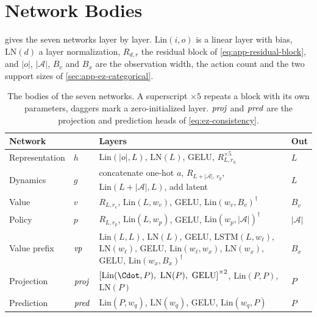\section{Network Bodies}\label{sec:app-ez-bodies}

 gives the seven networks layer by layer.
$\mathrm{Lin}(i,o)$ is a linear layer with bias, $\mathrm{LN}(d)$ a layer normalization,
$R_{d,r}$ the residual block of \cref{eq:app-residual-block}, and $|o|$, $|\mathcal{A}|$, $B_v$ and
$B_x$ are the observation width, the action count and the two support sizes of
\cref{sec:app-ez-categorical}.

\begin{table}[htbp]
  \centering
  \caption[Network bodies]{%
    The bodies of the seven networks.
    A superscript $\times 5$ repeats a block with its own parameters, daggers
    mark a zero-initialized layer.
    $\mathit{proj}$ and $\mathit{pred}$ are the projection and prediction heads of
    \cref{eq:ez-consistency}.
  }
  \label{tab:app-ez-bodies}
  \footnotesize
  \begin{tabularx}{\textwidth}{@{}ll>{\raggedright\arraybackslash}Xl@{}}
    \toprule
    Network & & Layers & Out \\
    \midrule
    Representation
      & $h$
      & $\mathrm{Lin}(|o|,L)$, $\mathrm{LN}(L)$, GELU, $R_{L,r_h}^{\times 5}$
      & $L$ \\
    Dynamics
      & $g$
      & concatenate one-hot $a$, $R_{L+|\mathcal{A}|,\,r_g}$,
        $\mathrm{Lin}(L+|\mathcal{A}|,L)$, add latent
      & $L$ \\
    Value
      & $v$
      & $R_{L,r_v}$, $\mathrm{Lin}(L,w_v)$, GELU, $\mathrm{Lin}(w_v,B_v)^{\dagger}$
      & $B_v$ \\
    Policy
      & $p$
      & $R_{L,r_p}$, $\mathrm{Lin}(L,w_p)$, GELU, $\mathrm{Lin}(w_p,|\mathcal{A}|)^{\dagger}$
      & $|\mathcal{A}|$ \\
    Value prefix
      & $\mathit{vp}$
      & $\mathrm{Lin}(L,L)$, $\mathrm{LN}(L)$, GELU, $\mathrm{LSTM}(L,w_\ell)$,
        $\mathrm{LN}(w_\ell)$, GELU, $\mathrm{Lin}(w_\ell,w_x)$, $\mathrm{LN}(w_x)$, GELU,
        $\mathrm{Lin}(w_x,B_x)^{\dagger}$
      & $B_x$ \\
    Projection
      & $\mathit{proj}$
      & $\left[\mathrm{Lin}(\Cdot,P),\ \mathrm{LN}(P),\ \text{GELU}\right]^{\times 2}$,
        $\mathrm{Lin}(P,P)$, $\mathrm{LN}(P)$
      & $P$ \\
    Prediction
      & $\mathit{pred}$
      & $\mathrm{Lin}(P,w_q)$, $\mathrm{LN}(w_q)$, GELU, $\mathrm{Lin}(w_q,P)$
      & $P$ \\
    \bottomrule
  \end{tabularx}
\end{table}

